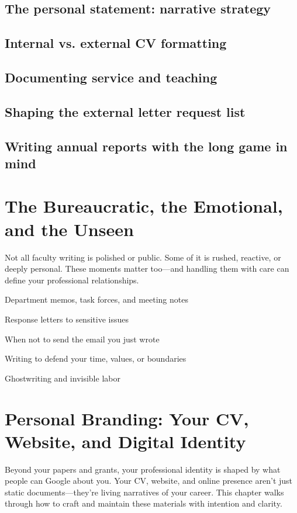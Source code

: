 \documentclass[oneside,11pt,dvipsnames]{book}
\begin{document}
\section{The personal statement: narrative strategy}

\section{Internal vs. external CV formatting}

\section{Documenting service and teaching}

\section{Shaping the external letter request list}

\section{Writing annual reports with the long game in mind}


\chapter{The Bureaucratic, the Emotional, and the Unseen}

Not all faculty writing is polished or public. Some of it is rushed, reactive, or deeply personal. These moments matter too—and handling them with care can define your professional relationships.

Department memos, task forces, and meeting notes

Response letters to sensitive issues

When not to send the email you just wrote

Writing to defend your time, values, or boundaries

Ghostwriting and invisible labor

\chapter{Personal Branding: Your CV, Website, and Digital Identity}

Beyond your papers and grants, your professional identity is shaped by what people can Google about you. Your CV, website, and online presence aren’t just static documents—they’re living narratives of your career. This chapter walks through how to craft and maintain these materials with intention and clarity.
\end{document}

